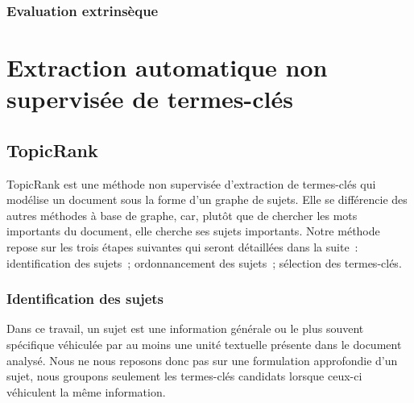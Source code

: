       \subsubsection{Evaluation extrinsèque}
      \label{subsubsec:main-automatic_keyphrase_annotation-keyphrase_candidate_selection-evaluation-extrinsic_evaluation}


  \section{Extraction automatique non supervisée de termes-clés}
  \label{sec:main-automatic_keyphrase_annotation-unsupervised_automatic_keyphrase_extraction}
    \subsection{TopicRank}
    \label{subsec:main-automatic_keyphrase_annotation-unsupervised_automatic_keyphrase_extraction-topicrank}
      TopicRank est une méthode non supervisée d'extraction de termes-clés qui
      modélise un document sous la forme d'un graphe de sujets.
      Elle se différencie des autres méthodes à base de graphe, car, plutôt que
      de chercher les mots importants du document, elle cherche ses sujets
      importants.
      Notre méthode repose sur les trois étapes suivantes qui seront détaillées
      dans la suite~: identification des sujets~; ordonnancement des sujets~;
      sélection des termes-clés.

      \subsubsection{Identification des sujets}
      \label{subsubsec:main-automatic_keyphrase_annotation-unsupervised_automatic_keyphrase_extraction-topicrank-topic_identification}
        Dans ce travail, un sujet est une information générale ou le plus
        souvent spécifique véhiculée par au moins une unité textuelle présente
        dans le document analysé. Nous ne nous reposons donc pas sur une
        formulation approfondie d'un sujet, nous groupons seulement les
        termes-clés candidats lorsque ceux-ci véhiculent la même information.

